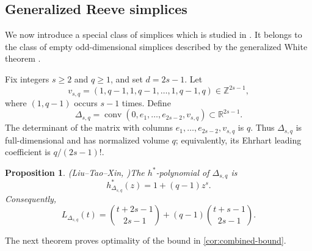 \documentclass[reqno, 12pt]{article}
\numberwithin{equation}{section}
\newtheorem{proposition}[theorem]{Proposition}
\theoremstyle{definition}
\newcommand{\R}{\mathbb{R}}
\newcommand{\Z}{\mathbb{Z}}
\newcommand{\conv}{\operatorname{conv}}
\begin{document}
\subsection{Generalized Reeve simplices}
\label{sec:sharp-family}

We now introduce a special class of simplices which is studied in \cite{LiuTaoXinSign}.  
It belongs to the class of empty odd-dimensional simplices described by the generalized
White theorem \cite[Theorem~1.10]{BatyrevHofscheier2021}.

Fix integers $s\geq2$ and $q\geq1$, and set $d=2s-1$.  Let
\[ v_{s,q}=(1,q-1,1,q-1,\ldots,1,q-1,q)\in\Z^{2s-1},
\]
where $(1,q-1)$ occurs $s-1$ times.  Define
\begin{equation*}
 \Delta_{s,q} =\conv(0,e_1,\ldots,e_{2s-2},v_{s,q})\subset\R^{2s-1}.
\end{equation*}
The determinant of the matrix with columns $e_1,\ldots,e_{2s-2},v_{s,q}$ is $q$.  Thus $\Delta_{s,q}$ is
full-dimensional and has normalized volume $q$; equivalently, its Ehrhart leading coefficient is $q/(2s-1)!$.

\begin{proposition}{\em (Liu--Tao--Xin, \cite{LiuTaoXinSign})}\label{prop:family-hstar}
The $h^*$-polynomial of $\Delta_{s,q}$ is
\begin{equation*}
  h_{\Delta_{s,q}}^*(z)=1+(q-1)z^s.
\end{equation*}
Consequently,
\begin{equation}\label{eq:family-ehrhart}
 L_{\Delta_{s,q}}(t)
 =\binom{t+2s-1}{2s-1}
 +(q-1)\binom{t+s-1}{2s-1}.
\end{equation}
\end{proposition}

The next theorem proves optimality of the bound in \cref{cor:combined-bound}.
\end{document}
